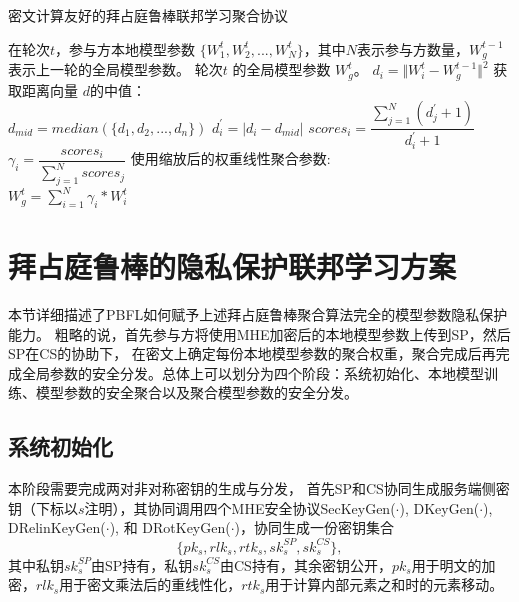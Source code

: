 \begin{algorithm}[htbp]
	\caption{密文计算友好的拜占庭鲁棒联邦学习聚合协议}
	\label{a0}
	\begin{algorithmic}[1]
		\REQUIRE 在轮次$t$，参与方本地模型参数 $\{W_1^t, W_2^t, ..., W_N^t\}$，其中$N$表示参与方数量，$W_g^{t-1}$ 表示上一轮的全局模型参数。
		\ENSURE 轮次$t$ 的全局模型参数 $W_g^t$。 
		\STATE ${d}_i = \Vert W_i^t - W_g^{t-1} \Vert ^2$
		\ENDFOR
		\STATE 获取距离向量 ${d}$的中值：\\${d}_{mid} = median(\{{d}_{1}, {d}_{2},..., {d}_{n}\})$
		\STATE $d^{\prime}_{i}=\left|d_i-d_{mid}\right|$
		\ENDFOR
	\STATE $scores_i=\dfrac{\sum_{j=1}^{N} (d^{\prime}_{j} + 1)}{d^{\prime}_i + 1}$ 
	\ENDFOR
	\STATE $\gamma_i=\dfrac{scores_i}{\sum_{j=1}^{N} scores_j}$
	\ENDFOR
	\STATE 使用缩放后的权重线性聚合参数:\\
	$W_g^{t} =\sum_{i=1}^{N}\gamma_i * W_i^{t}$
\end{algorithmic}
\end{algorithm}

\section{拜占庭鲁棒的隐私保护联邦学习方案}\label{PBFL}
本节详细描述了PBFL如何赋予上述拜占庭鲁棒聚合算法完全的模型参数隐私保护能力。
粗略的说，首先参与方将使用MHE加密后的本地模型参数上传到SP，然后SP在CS的协助下，
在密文上确定每份本地模型参数的聚合权重，聚合完成后再完成全局参数的安全分发。总体上可以划分为四个阶段：系统初始化、本地模型训练、模型参数的安全聚合以及聚合模型参数的安全分发。

\subsection{系统初始化}
本阶段需要完成两对非对称密钥的生成与分发，
首先SP和CS协同生成服务端侧密钥（下标以$ s $注明），其协同调用四个MHE安全协议SecKeyGen($\cdot$), DKeyGen($\cdot$), DRelinKeyGen($\cdot$), 和 DRotKeyGen($\cdot$)，协同生成一份密钥集合$$ \{pk_s, rlk_s, rtk_s, sk_{s}^{SP}, sk_{s}^{CS}\},$$其中私钥$ sk_{s}^{SP} $由SP持有，私钥$ sk_{s}^{CS} $由CS持有，其余密钥公开，$ pk_s $用于明文的加密，$ rlk_s $用于密文乘法后的重线性化，$ rtk_s $用于计算内部元素之和时的元素移动。

